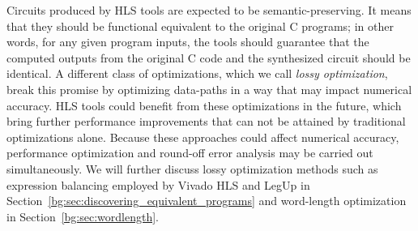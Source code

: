 Circuits produced by HLS tools are expected to be semantic-preserving.  It
means that they should be functional equivalent to the original C programs; in
other words, for any given program inputs, the tools should guarantee that the
computed outputs from the original C code and the synthesized circuit should
be identical.  A different class of optimizations, which we call \emph{lossy
optimization}, break this promise by optimizing data-paths in a way that may
impact numerical accuracy.  HLS tools could benefit from these optimizations
in the future, which bring further performance improvements that can not
be attained by traditional optimizations alone.  Because these approaches
could affect numerical accuracy, performance optimization and round-off error
analysis may be carried out simultaneously.  We will further discuss lossy
optimization methods such as expression balancing employed by Vivado HLS and
LegUp in Section~\ref{bg:sec:discovering_equivalent_programs} and word-length
optimization in Section~\ref{bg:sec:wordlength}.
